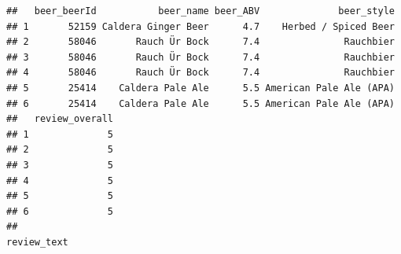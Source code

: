 \documentclass[
  a4paper,
]{article}
\begin{document}
\begin{verbatim}
##   beer_beerId           beer_name beer_ABV              beer_style
## 1       52159 Caldera Ginger Beer      4.7    Herbed / Spiced Beer
## 2       58046       Rauch Ür Bock      7.4               Rauchbier
## 3       58046       Rauch Ür Bock      7.4               Rauchbier
## 4       58046       Rauch Ür Bock      7.4               Rauchbier
## 5       25414    Caldera Pale Ale      5.5 American Pale Ale (APA)
## 6       25414    Caldera Pale Ale      5.5 American Pale Ale (APA)
##   review_overall
## 1              5
## 2              5
## 3              5
## 4              5
## 5              5
## 6              5
##                                                                                                                                                                                                                                                                                                                                                                                                                                                                                                                                                                                                                                                                                                                                                                                                                                                                                                                                                                                                                                                                                                                                                                                                                                                                                                                                                                                                                                                                                                                                                                                                                                                                                                                                                                                                                                                                                                                                                                                                                                                                                                                                             review_text

\end{verbatim}
\end{document}
